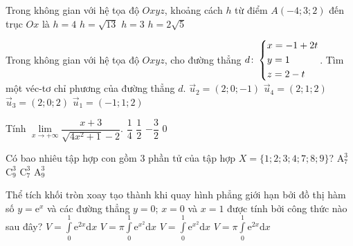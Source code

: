 \begin{ex}%
Trong không gian với hệ tọa độ $Oxyz$, khoảng cách $h$ từ điểm $A(-4;3;2)$ đến trục $Ox$ là
	\choice
	{$h=4$}
	{\True $h=\sqrt{13}$}
	{$h=3$}
	{$h=2\sqrt{5}$}
\end{ex}
\begin{ex}%
Trong không gian với hệ tọa độ $Oxyz$, cho đường thẳng $ d\colon \left\{\begin{aligned}&x=-1+2t\\&y=1\\&z=2-t\end{aligned}\right. $. Tìm một véc-tơ chỉ phương của đường thẳng $d$.
	\choice
	{\True $\overrightarrow{u}_2=(2;0;-1)$}
	{$\overrightarrow{u}_4=(2;1;2)$}
	{$\overrightarrow{u}_3=(2;0;2)$}
	{$\overrightarrow{u}_1=(-1;1;2)$}
\end{ex}
\begin{ex}%
	Tính $\lim\limits_{x\to +\infty} \dfrac{x+3}{\sqrt{4x^2+1}-2}$.
	\choice
	{$\dfrac{1}{4}$}
	{\True $\dfrac{1}{2}$}
	{$-\dfrac{3}{2}$}
	{$0$}
\end{ex}

\begin{ex}%
	Có bao nhiêu tập hợp con gồm $3$ phần tử của tập hợp $X=\{1;2;3;4;7;8;9\}$?
	\choice
	{$\mathrm{A}_7^3$}
	{$\mathrm{C}_9^3$}
	{\True $\mathrm{C}_7^3$}
	{$\mathrm{A}_9^3$}
\end{ex}

\begin{ex}%
	Thể tích khối tròn xoay tạo thành khi quay hình phẳng giới hạn bởi đồ thị hàm số $y=\mathrm{e}^x$ và các đường thẳng $y=0$; $x=0$ và $x=1$ được tính bởi công thức nào sau đây?
	\choice
	{$V=\displaystyle\int\limits_0^1 \mathrm{e}^{2x} \mathrm{d}x$}
	{$V=\pi \displaystyle\int\limits_0^1 \mathrm{e}^{x^2} \mathrm{d}x$}
	{$V=\displaystyle\int\limits_0^1 \mathrm{e}^{x^2} \mathrm{d}x$}
	{\True $V=\pi \displaystyle\int\limits_0^1 \mathrm{e}^{2x} \mathrm{d}x$}
\end{ex}

